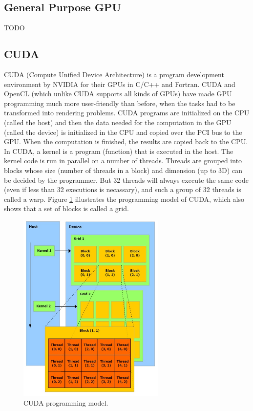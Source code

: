 \subsection{General Purpose GPU}
TODO 

\subsection{CUDA}
CUDA (Compute Uniﬁed Device Architecture) is a program development environment by NVIDIA for their GPUs in C/C++ and Fortran. CUDA and OpenCL (which unlike CUDA supports all kinds of GPUs) have made GPU programming much more user-friendly than before, when the tasks had to be transformed into rendering problems. CUDA programs are initialized on the CPU (called the host) and then the data needed for the computation in the GPU (called the device) is initialized in the CPU and copied over the PCI bus to the GPU. When the computation is finished, the results are copied back to the CPU. In CUDA, a kernel is a program (function) that is executed in the host. The kernel code is run in parallel on a number of threads. Threads are grouped into blocks whose size (number of threads in a block) and dimension (up to 3D) can be decided by the programmer. But 32 threads will always execute the same code (even if less than 32 executions is necassary), and such a group of 32 threads is called a warp. Figure \ref{CUDAProgModel} illustrates the programming model of CUDA, which also shows that a set of blocks is called a grid.

\begin{figure}[h!]
\centering
\includegraphics[width=0.65\textwidth]{backgroundTheory/parallel/CUDAProgModel}
\caption{CUDA programming model.}
\label{CUDAProgModel}
\end{figure} 

